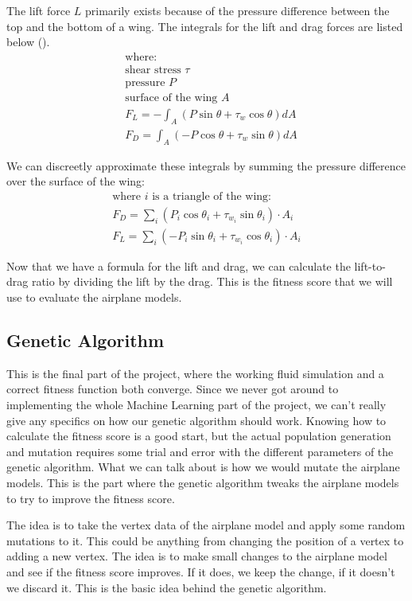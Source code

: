 \documentclass[a4paper,12pt,titlepage]{article}
\begin{document}
The lift force $L$ primarily exists because of the pressure difference between
the top and the bottom of a wing. The integrals for the lift and drag forces are
listed below (\cite{liftdrag}).
\[
	\begin{aligned}
		& \text{where:} \\
		& \text{shear stress } \tau \\
		& \text{pressure } P \\
		& \text{surface of the wing } A \\
		& F_L = -\int_A (P \sin \theta + \tau_w \cos \theta) dA \\
		& F_D = \int_A (-P \cos \theta + \tau_w \sin \theta) dA
	\end{aligned}
\]


We can discreetly approximate these integrals by summing the pressure difference
over the surface of the wing:
\[
	\begin{array}{l}
		\text{where $i$ is a triangle of the wing:} \\
		F_D = \sum\limits_i (P_i \cos \theta_i + \tau_{w_i} \sin \theta_i) \cdot A_i \\
		F_L = \sum\limits_i (-P_i \sin \theta_i + \tau_{w_i} \cos \theta_i) \cdot A_i
	\end{array}
\]

Now that we have a formula for the lift and drag, we can calculate the lift-to-drag
ratio by dividing the lift by the drag. This is the fitness score that we will
use to evaluate the airplane models.

\subsection{Genetic Algorithm} \label{genalg}
This is the final part of the project, where the working fluid simulation and a
correct fitness function both converge. Since we never got around to implementing
the whole Machine Learning part of the project, we can't really give any specifics
on how our genetic algorithm should work. Knowing how to calculate the fitness
score is a good start, but the actual population generation and mutation requires
some trial and error with the different parameters of the genetic algorithm.
What we can talk about is how we would mutate the airplane models. This is the
part where the genetic algorithm tweaks the airplane models to try to improve
the fitness score.

The idea is to take the vertex data of the airplane model and apply some random
mutations to it. This could be anything from changing the position of a vertex
to adding a new vertex. The idea is to make small changes to the airplane model
and see if the fitness score improves. If it does, we keep the change, if it
doesn't we discard it. This is the basic idea behind the genetic algorithm.
\end{document}
